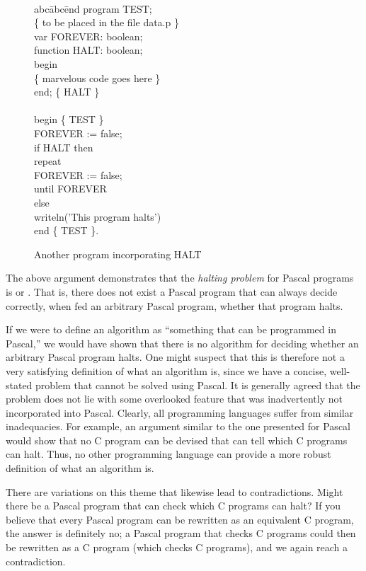 \begin{figure}
{\tt
\begin{tabbing}
abc\=abc\=end\kill
program TEST; \\
\{ to be placed in the file data.p \} \\
var FOREVER: boolean; \\
\> function HALT: boolean; \\
\> begin \\
\>\> \{ marvelous code goes here \} \\
\> end; \{ HALT \} \\
\\
begin \{ TEST \} \\
FOREVER := false; \\
if HALT then \\
\> repeat \\
\>\> FOREVER := false; \\
\> until FOREVER \\
else \\
\> writeln('This program halts') \\
end \{ TEST \}.
\end{tabbing}
}
\caption{Another program incorporating HALT}\label{fig-12.6}
\end{figure}

The above argument demonstrates that the \emph{halting problem} for
Pascal programs is \emph{} or \emph{}. That
is, there does not exist a Pascal program that can always decide correctly, when
fed an arbitrary Pascal program, whether that program halts.

If we were to define an algorithm as ``something that can be programmed in
Pascal,'' we would have shown that there is no algorithm for deciding whether
an arbitrary Pascal program halts. One might suspect that this is therefore not
a very satisfying definition of what an algorithm is, since we have a concise,
well-stated problem that cannot be solved using Pascal. It is generally agreed
that the problem does not lie with some overlooked feature that was
inadvertently not incorporated into Pascal. Clearly, all programming languages
suffer from similar inadequacies. For example, an argument similar to the one
presented for Pascal would show that no C program can be devised that can tell
which C programs can halt. Thus, no other programming language can provide a
more robust definition of what an algorithm is.

There are variations on this theme that likewise lead to contradictions. Might
there be a Pascal program that can check which C programs can halt? If you
believe that every Pascal program can be rewritten as an equivalent C program,
the answer is definitely no; a Pascal program that checks C programs could then
be rewritten as a C program (which checks C programs), and we again reach a
contradiction.

